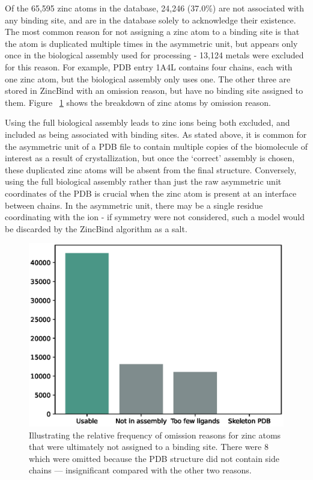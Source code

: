 Of the 65,595 zinc atoms in the database, 24,246 (37.0\%) are not associated with any binding site, and are in the database solely to acknowledge their existence. The most common reason for not assigning a zinc atom to a binding site is that the atom is duplicated multiple times in the asymmetric unit, but appears only once in the biological assembly used for processing - 13,124 metals were excluded for this reason. For example, PDB entry 1A4L contains four chains, each with one zinc atom, but the biological assembly only uses one. The other three are stored in ZincBind with an omission reason, but have no binding site assigned to them. Figure ~\ref{fig:omission} shows the breakdown of zinc atoms by omission reason.

Using the full biological assembly leads to zinc ions being both excluded, and included as being associated with binding sites. As stated above, it is common for the asymmetric unit of a PDB file to contain multiple copies of the biomolecule of interest as a result of crystallization, but once the `correct' assembly is chosen, these duplicated zinc atoms will be absent from the final structure. Conversely, using the full biological assembly rather than just the raw asymmetric unit coordinates of the PDB is crucial when the zinc atom is present at an interface between chains. In the asymmetric unit, there may be a single residue coordinating with the ion - if symmetry were not considered, such a model would be discarded by the ZincBind algorithm as a salt.

\begin{figure}
\centering
\includegraphics[width=1.0\textwidth]{Figures/omission.eps}
\caption{\label{fig:omission} Illustrating the relative frequency of omission reasons for zinc
atoms that were ultimately not assigned to a binding site. There were 8 which were omitted because
the PDB structure did not contain side chains --- insignificant compared with the other two reasons.}
\end{figure}

